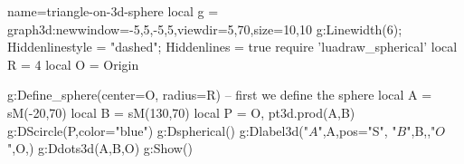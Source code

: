 \documentclass[12pt]{standalone}
\begin{document}
\begin{luadraw}{name=triangle-on-3d-sphere}
  local g = graph3d:new{window={-5,5,-5,5},viewdir={5,70},size={10,10}}
  g:Linewidth(6); Hiddenlinestyle = "dashed"; Hiddenlines = true
  require 'luadraw_spherical'
  local R = 4
  local O = Origin
  
  g:Define_sphere({center=O, radius=R}) -- first we define the sphere
  local A =  sM(-20,70)   
  local B =  sM(130,70)   
  local P = {O, pt3d.prod(A,B)}
  g:DScircle(P,{color="blue"})
  g:Dspherical()
  g:Dlabel3d("$A$",A,{pos="S"}, "$B$",B,{},"$O$",O,{})
  g:Ddots3d({A,B,O})
  g:Show()
\end{luadraw}
\end{document}
